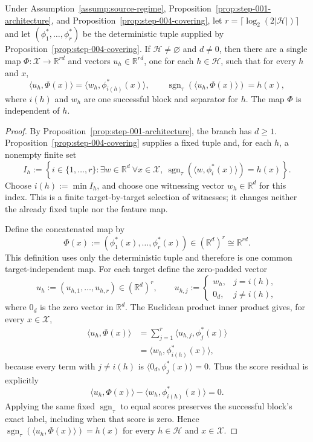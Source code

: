 \begin{lemma}
\label{lem:step-005-score}
Under Assumption~\ref{assump:source-regime},
Proposition~\ref{prop:step-001-architecture}, and
Proposition~\ref{prop:step-004-covering}, let
$r=\lceil\log_2(2|\mathcal H|)\rceil$ and let
$(\phi_1^*,\ldots,\phi_r^*)$ be the deterministic tuple supplied by
Proposition~\ref{prop:step-004-covering}.  If
$\mathcal H\neq\varnothing$ and $d\neq0$, then there are a single map
$\Phi:\mathcal X\to\mathbb R^{rd}$ and vectors
$u_h\in\mathbb R^{rd}$, one for each $h\in\mathcal H$, such that for every
$h$ and $x$,
\[
\langle u_h,\Phi(x)\rangle
=\langle w_h,\phi_{i(h)}^*(x)\rangle,
\qquad
\operatorname{sgn}_{\tau}(\langle u_h,\Phi(x)\rangle)=h(x),
\]
where $i(h)$ and $w_h$ are one successful block and separator for $h$.
The map $\Phi$ is independent of $h$.
\end{lemma}

\begin{proof}
By Proposition~\ref{prop:step-001-architecture}, the branch has $d\geq1$.
Proposition~\ref{prop:step-004-covering} supplies a fixed tuple and, for each
$h$, a nonempty finite set
\[
I_h:=\left\{i\in\{1,\ldots,r\}:\exists w\in\mathbb R^d\ \forall x\in\mathcal X,
\ \operatorname{sgn}_{\tau}(\langle w,\phi_i^*(x)\rangle)=h(x)\right\}.
\]
Choose $i(h):=\min I_h$, and choose one witnessing vector
$w_h\in\mathbb R^d$ for this index.  This is a finite target-by-target
selection of witnesses; it changes neither the already fixed tuple nor the
feature map.

Define the concatenated map by
\[
\Phi(x):=(\phi_1^*(x),\ldots,\phi_r^*(x))
\in(\mathbb R^d)^r\cong\mathbb R^{rd}.
\]
This definition uses only the deterministic tuple and therefore is one common
target-independent map.  For each target define the zero-padded vector
\[
u_h:=(u_{h,1},\ldots,u_{h,r})\in(\mathbb R^d)^r,
\qquad
u_{h,j}:=
\begin{cases}
w_h,&j=i(h),\\
0_d,&j\neq i(h),
\end{cases}
\]
where $0_d$ is the zero vector in $\mathbb R^d$.  The Euclidean product inner
product gives, for every $x\in\mathcal X$,
\[
\begin{aligned}
\langle u_h,\Phi(x)\rangle
&=\sum_{j=1}^{r}\langle u_{h,j},\phi_j^*(x)\rangle\\
&=\langle w_h,\phi_{i(h)}^*(x)\rangle,
\end{aligned}
\]
because every term with $j\neq i(h)$ is
$\langle0_d,\phi_j^*(x)\rangle=0$.  Thus the score residual is explicitly
\[
\langle u_h,\Phi(x)\rangle
-\langle w_h,\phi_{i(h)}^*(x)\rangle=0.
\]
Applying the same fixed $\operatorname{sgn}_{\tau}$ to equal scores preserves
the successful block's exact label, including when that score is zero.  Hence
$\operatorname{sgn}_{\tau}(\langle u_h,\Phi(x)\rangle)=h(x)$ for every
$h\in\mathcal H$ and $x\in\mathcal X$.
\end{proof}

